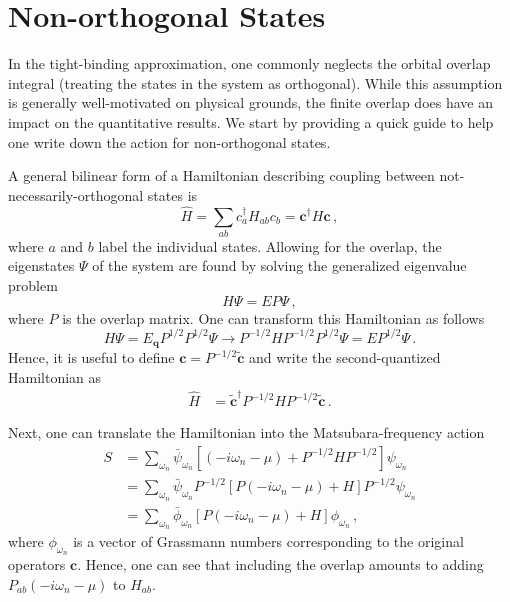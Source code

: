 \documentclass[aps, prb, superscriptaddress, preprint, floatfix]{revtex4-1}
\begin{document}
\section{Non-orthogonal States}

In the tight-binding approximation, one commonly neglects the orbital overlap integral (treating the states in the system as orthogonal). While this assumption is generally well-motivated on physical grounds, the finite overlap does have an impact on the quantitative results. We start by providing a quick guide to help one write down the action for non-orthogonal states.

A general bilinear form of a Hamiltonian describing coupling between not-necessarily-orthogonal states is
%
\begin{equation}
	\hat{H} = \sum_{ab} c_a^\dagger H_{ab} c_b = \mathbf{c}^\dagger H \mathbf{c}\,,
\end{equation}
%
where $a$ and $b$ label the individual states. Allowing for the overlap, the eigenstates $\Psi$ of the system are found by solving the generalized eigenvalue problem
%
\begin{equation}
	H\Psi = E P\Psi\,,
\end{equation}
%
where $P$ is the overlap matrix. One can transform this Hamiltonian as follows
%
\begin{equation}
	H\Psi= E_\mathbf{q}P^{1/2} P^{1/2} \Psi
	\rightarrow 
	P^{-1/2}HP^{-1/2}P^{1/2}\Psi = E P^{1/2} \Psi\,.
\end{equation}
%
Hence, it is useful to define $\mathbf{c} = P^{-1/2}\tilde{\mathbf{c}}$ and write the second-quantized Hamiltonian as
%
\begin{align}
    \hat{H} &= \tilde{\mathbf{c}}^\dagger P^{-1/2}
    H
    P^{-1/2}\tilde{\mathbf{c}}
    \,.
\end{align}
%

Next, one can translate the Hamiltonian into the Matsubara-frequency action
%
\begin{align}
    S &= \sum_{\omega_n} \bar\psi_{\omega_n}
    \left[\left(-i\omega_n-\mu\right)
    + 
    P^{-1/2}
    H
    P^{-1/2}
    \right]
    \psi_{\omega_n}
    \nonumber
    \\
    &= \sum_{\omega_n} \bar\psi_{\omega_n}
    P^{-1/2}
    \left[P\left(-i\omega_n-\mu\right)
    + 
    H
    \right]
    P^{-1/2}\psi_{\omega_n}
    \nonumber
    \\
    &= \sum_{\omega_n} \bar\phi_{\omega_n}
    \left[P\left(-i\omega_n-\mu\right)
    + 
    H
    \right]
    \phi_{\omega_n}
    \,,
\end{align}
%
where $\phi_{\omega_n}$ is a vector of Grassmann numbers corresponding to the original operators $\mathbf{c}$. Hence, one can see that including the overlap amounts to adding $P_{ab}(-i\omega_n - \mu)$ to $H_{ab}$.
\end{document}
